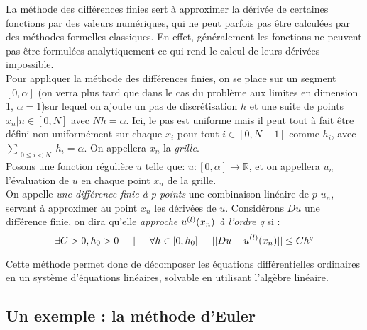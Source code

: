 \documentclass[12pt]{article}
\newcommand{\R}{\mathbb R}
\begin{document}
\quad La méthode des différences finies sert à approximer la dérivée de certaines fonctions par des valeurs numériques, qui ne peut parfois pas être calculées par des méthodes formelles classiques. En effet, généralement les fonctions ne peuvent pas être formulées analytiquement ce qui rend le calcul de leurs dérivées impossible.
\\
\quad Pour appliquer la méthode des différences finies, on se place sur un segment $[0, \alpha]$ (on verra plus tard que dans le cas du problème aux limites en dimension 1, $\alpha = 1$)sur lequel on ajoute un pas de discrétisation $h$ et une suite de points $x_n | n\in [0, N]$ avec $Nh = \alpha$. Ici, le pas est uniforme mais il peut tout à fait être défini non uniformément sur chaque $x_i$ pour tout $i \in [0, N-1]$ comme $h_i$, avec $\sum_{\substack{0 \le i< N}}h_i = \alpha$. On appellera $x_n$ la \emph{grille}.
\\
\quad Posons une fonction régulière $u$ telle que: $u : [0, \alpha] \longrightarrow \R$, et on appellera $u_n$ l'évaluation de $u$ en chaque point $x_n$ de la grille. \\
On appelle \emph{une différence finie à p points} une combinaison linéaire de $p$ $u_n$, servant à approximer au point $x_n$ les dérivées de $u$. Considérons $Du$ une différence finie, on dira qu'elle \emph{approche $u^{(l)}\relax(x_n)$ à l'ordre q} si :
\begin{equation}
\exists C>0, h_0 >0 \hspace{5mm}|\hspace{5mm} \forall h \in [0, h_0] \hspace{5mm} ||Du - u^{(l)}\relax(x_n)|| \le Ch^q
\end{equation}



\quad Cette méthode permet donc de décomposer les équations différentielles ordinaires en un système d'équations linéaires, solvable en utilisant l'algèbre linéaire.

\subsection{Un exemple : la méthode d'Euler}
\end{document}
